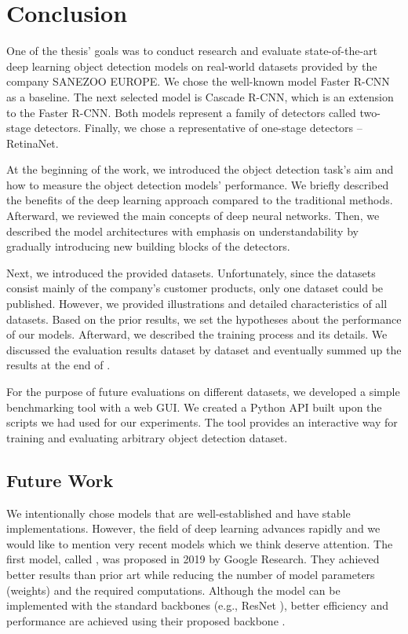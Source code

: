 \chapter{Conclusion}\label{chap:conclusion}

One of the thesis' goals was to conduct research and evaluate state-of-the-art
deep learning object detection models on real-world datasets provided by the
company SANEZOO EUROPE. We chose the well-known model Faster R-CNN as a
baseline. The next selected model is Cascade R-CNN, which is an extension to the
Faster R-CNN. Both models represent a family of detectors called two-stage
detectors. Finally, we chose a representative of one-stage detectors --
RetinaNet.

At the beginning of the work, we introduced the object detection task's aim and
how to measure the object detection models' performance. We briefly described
the benefits of the deep learning approach compared to the traditional methods.
Afterward, we reviewed the main concepts of deep neural networks. Then, we
described the model architectures with emphasis on understandability by
gradually introducing new building blocks of the detectors.

Next, we introduced the provided datasets. Unfortunately, since the
datasets consist mainly of the company's customer products, only one dataset
could be published. However, we provided illustrations and detailed
characteristics of all datasets. Based on the prior results, we set the hypotheses about
the performance of our models. Afterward, we described the training
process and its details. We discussed the evaluation results dataset by
dataset and eventually summed up the results at the end of .

For the purpose of future evaluations on different datasets, we developed
a simple benchmarking tool with a web GUI. We created a Python API built
upon the scripts we had used for our experiments. The tool provides an
interactive way for training and evaluating arbitrary object detection dataset.

\section{Future Work}
We intentionally chose models that are well-established and have stable
implementations. However, the field of deep learning advances rapidly and we
would like to mention very recent models which we think deserve attention. The
first model, called  \cite{efficientdet}, was proposed in 2019 by
Google Research. They achieved better results than prior art while reducing the
number of model parameters (weights) and the required computations. Although the
model can be implemented with the standard backbones (e.g., ResNet
\cite{resnet}), better efficiency and performance are achieved using their
proposed backbone  \cite{efficientnet}.

